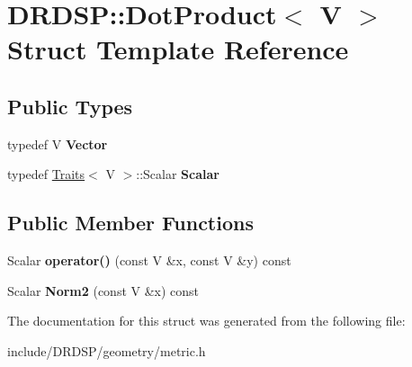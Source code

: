\hypertarget{struct_d_r_d_s_p_1_1_dot_product}{\section{D\-R\-D\-S\-P\-:\-:Dot\-Product$<$ V $>$ Struct Template Reference}
\label{struct_d_r_d_s_p_1_1_dot_product}
}
\subsection*{Public Types}
\begin{DoxyCompactItemize}
\item 
\hypertarget{struct_d_r_d_s_p_1_1_dot_product_a674690d8ab49b8908928fe2504c3f622}{typedef V {\bfseries Vector}}\label{struct_d_r_d_s_p_1_1_dot_product_a674690d8ab49b8908928fe2504c3f622}

\item 
\hypertarget{struct_d_r_d_s_p_1_1_dot_product_ac0a16f6680afea3bce145857073df6a4}{typedef \hyperlink{struct_d_r_d_s_p_1_1_traits}{Traits}$<$ V $>$\-::Scalar {\bfseries Scalar}}\label{struct_d_r_d_s_p_1_1_dot_product_ac0a16f6680afea3bce145857073df6a4}

\end{DoxyCompactItemize}
\subsection*{Public Member Functions}
\begin{DoxyCompactItemize}
\item 
\hypertarget{struct_d_r_d_s_p_1_1_dot_product_a7122ebb044ab606bc90eb87ce8cab3f7}{Scalar {\bfseries operator()} (const V \&x, const V \&y) const }\label{struct_d_r_d_s_p_1_1_dot_product_a7122ebb044ab606bc90eb87ce8cab3f7}

\item 
\hypertarget{struct_d_r_d_s_p_1_1_dot_product_a0fd7ddd85af95144a24b541ddd61c74e}{Scalar {\bfseries Norm2} (const V \&x) const }\label{struct_d_r_d_s_p_1_1_dot_product_a0fd7ddd85af95144a24b541ddd61c74e}

\end{DoxyCompactItemize}


The documentation for this struct was generated from the following file\-:\begin{DoxyCompactItemize}
\item 
include/\-D\-R\-D\-S\-P/geometry/metric.\-h\end{DoxyCompactItemize}
